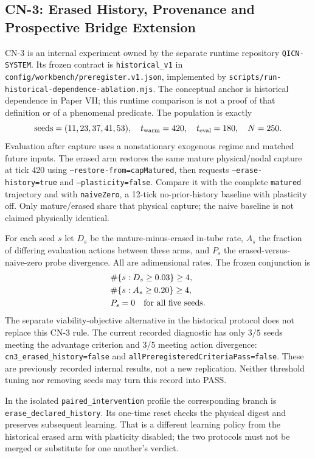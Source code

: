 \documentclass[11pt,a4paper]{article}
\theoremstyle{definition}
\begin{document}
\subsection{CN-3: Erased History, Provenance and Prospective Bridge Extension}
\label{sec:bridge-cn3-contract}
CN-3 is an internal experiment owned by the separate runtime repository
\texttt{QICN-SYSTEM}. Its frozen contract is \texttt{historical\_v1} in
\texttt{config/workbench/preregister.v1.json}, implemented by
\texttt{scripts/run-historical-dependence-ablation.mjs}.
The conceptual anchor is historical dependence in Paper VII; this runtime
comparison is not a proof of that definition or of a phenomenal predicate.
The population is exactly
\[
 \mathrm{seeds}=(11,23,37,41,53),\quad
 t_{\rm warm}=420,\quad t_{\rm eval}=180,\quad N=250.
\]
Evaluation after capture uses a nonstationary exogenous regime and matched
future inputs. The erased arm restores the same mature physical/nodal
capture at tick 420 using \texttt{--restore-from=capMatured}, then requests
\texttt{--erase-history=true} and \texttt{--plasticity=false}.
Compare it with the complete \texttt{matured} trajectory and with
\texttt{naiveZero}, a 12-tick no-prior-history baseline with plasticity off.
Only mature/erased share that physical capture; the naive baseline is not
claimed physically identical.

For each seed $s$ let $D_s$ be the mature-minus-erased in-tube rate,
$A_s$ the fraction of differing evaluation actions between these arms,
and $P_s$ the erased-versus-naive-zero probe divergence. All are
adimensional rates. The frozen conjunction is
\[
 \begin{aligned}
 &\#\{s:D_s\ge0.03\}\ge4,\\
 &\#\{s:A_s\ge0.20\}\ge4,\\
 &P_s=0\quad\hbox{for all five seeds}.
 \end{aligned}
\]
The separate viability-objective alternative in the historical protocol does
not replace this CN-3 rule. The current recorded diagnostic has only $3/5$
seeds meeting the advantage criterion and $3/5$ meeting action divergence:
\texttt{cn3\_erased\_history=false} and
\texttt{allPreregisteredCriteriaPass=false}.
These are previously recorded internal results, not a new replication.
Neither threshold tuning nor removing seeds may turn this record into PASS.

In the isolated \texttt{paired\_intervention} profile the corresponding
branch is \texttt{erase\_\allowbreak{}declared\_\allowbreak{}history}. Its one-time reset checks the
physical digest and preserves subsequent learning. That is a different
learning policy from the historical erased arm with plasticity disabled;
the two protocols must not be merged or substitute for one another's verdict.
\end{document}
